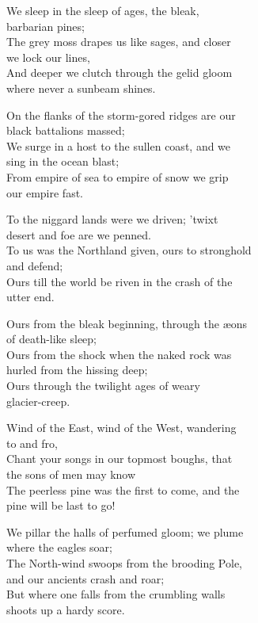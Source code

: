 
\begin{poemblock}
We sleep in the sleep of ages, the bleak,\\
\idt barbarian pines;\\
The grey moss drapes us like sages, and closer\\
\idt we lock our lines,\\
And deeper we clutch through the gelid gloom\\
\idt where never a sunbeam shines.

On the flanks of the storm-gored ridges are our\\
\idt black battalions massed;\\
We surge in a host to the sullen coast, and we\\
\idt sing in the ocean blast;\\
From empire of sea to empire of snow we grip\\
\idt our empire fast.

To the niggard lands were we driven; 'twixt\\
\idt desert and foe are we penned.\\
To us was the Northland given, ours to stronghold\\
\idt and defend;\\
Ours till the world be riven in the crash of the\\
\idt utter end.

Ours from the bleak beginning, through the æons\\
\idt of death-like sleep;\\
Ours from the shock when the naked rock was\\
\idt hurled from the hissing deep;\\
Ours through the twilight ages of weary\\
\idt glacier-creep.

Wind of the East, wind of the West, wandering\\
\idt to and fro,\\
Chant your songs in our topmost boughs, that\\
\idt the sons of men may know\\
The peerless pine was the first to come, and the\\
\idt pine will be last to go!

We pillar the halls of perfumed gloom; we plume\\
\idt where the eagles soar;\\
The North-wind swoops from the brooding Pole,\\
\idt and our ancients crash and roar;\\
But where one falls from the crumbling walls\\
\idt shoots up a hardy score.


\end{poemblock}
